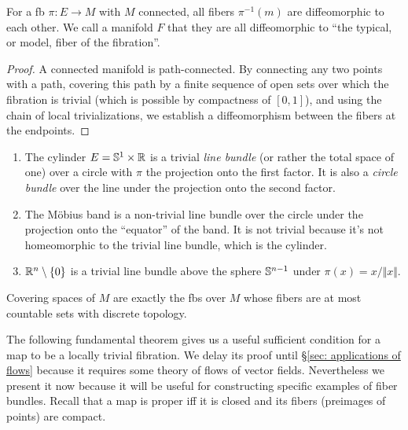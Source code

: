 \begin{prop}
    For a \gls{fb} $\pi:E\to M$ with $M$ connected, all fibers $\pi^{-1}(m)$ are diffeomorphic to each other. We call a manifold $F$ that they are all diffeomorphic to ``the typical, or model, fiber of the fibration''.
\end{prop}
\begin{proof}
    A connected manifold is path-connected. By connecting any two points with a path, covering this path by a finite sequence of open sets over which the fibration is trivial (which is possible by compactness of $[0,1]$), and using the chain of local trivializations, we establish a diffeomorphism between the fibers at the endpoints.
\end{proof}
\begin{example}
\begin{enumerate}
    \item The cylinder $E=\mathbb{S}^1\times\mathbb{R} $ is a trivial \emph{line bundle} (or rather the total space of one) over a circle with $\pi$ the projection onto the first factor. It is also a \emph{circle bundle} over the line under the projection onto the second factor.
    \item The M\"obius band is a non-trivial line bundle over the circle under the projection onto the ``equator'' of the band. It is not trivial because it's not homeomorphic to the trivial line bundle, which is the cylinder.
    \item $\mathbb{R}^n\setminus\{0\}$ is a trivial line bundle above the sphere $\mathbb{S}^{n-1}$ under $\pi(x)=x/\Vert x\Vert$.
\end{enumerate}
\end{example}

\begin{example}
    Covering spaces of $M$ are exactly the \glspl{fb} over $M$ whose fibers are at most countable sets with discrete topology.
\end{example}

The following fundamental theorem gives us a useful sufficient condition for a map to be a locally trivial fibration. We delay its proof until \S\ref{sec: applications of flows} because it requires some theory of flows of vector fields. Nevertheless we present it now because it will be useful for constructing specific examples of fiber bundles. Recall that a map is proper iff it is closed and its fibers (preimages of points) are compact.

